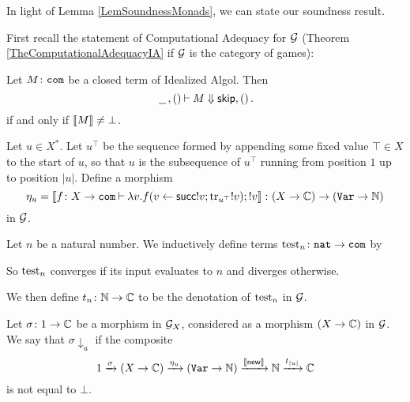In light of Lemma \ref{LemSoundnessMonads}, we can state our soundness result.

First recall the statement of Computational Adequacy for $\mathcal G$ (Theorem \ref{TheComputationalAdequacyIA} if $\mathcal G$ is the category of games):

\begin{theorem}
  Let $M\colon {\mathtt{com}}$ be a closed term of Idealized Algol.  
  Then
  \[
    \,\underline{\hspace{1.5ex}}\,,()\mathbin{\vdash} M\Downarrow {\mathsf{skip}},()\,.
    \]
  if and only if $\left\llbracket M\right\rrbracket \ne \bot$.
\end{theorem}

\begin{definition}
  Let $u\in X^*$.
  Let $u^\top$ be the sequence formed by appending some fixed value $\top\in X$ to the start of $u$, so that $u$ is the subsequence of $u^\top$ running from position $1$ up to position $|u|$.
  Define a morphism
  \[
    \eta_u = \left\llbracket f\colon X \to {\mathtt{com}} \mathbin{\vdash} \lambda v.f(v\gets \operatorname{{\mathsf{succ}}} !v;\operatorname{tr}_{u^\top} !v);!v\right\rrbracket \colon (X \to \mathbb{C}) \to ({\mathtt{Var}} \to \mathbb{N})
    \]
  in $\mathcal G$.
\end{definition}

\begin{definition}
  Let $n$ be a natural number.  
  We inductively define terms $\operatorname{test}_n\colon {\mathtt{nat}} \to {\mathtt{com}}$ by
  So $\operatorname{test}_n$ converges if its input evaluates to $n$ and diverges otherwise.

  We then define $t_n\colon \mathbb{N} \to \mathbb{C}$ to be the denotation of $\operatorname{test}_n$ in $\mathcal G$.
\end{definition}

\begin{definition}
  Let $\sigma \colon 1 \to \mathbb{C}$ be a morphism in $\mathcal G_X$, considered as a morphism $(X \to \mathbb{C})$ in $\mathcal G$.  
  We say that $\sigma\downarrow_u$ if the composite
  \[
    1 \xrightarrow{\sigma}
    (X \to \mathbb{C}) \xrightarrow{\eta_u}
    ({\mathtt{Var}} \to \mathbb{N}) \xrightarrow{\left\llbracket\operatorname{{\mathsf{new}}}\right\rrbracket}
    \mathbb{N} \xrightarrow{t_{|u|}}
    \mathbb{C}
    \]
  is not equal to $\bot$.
  \label{DefDenotationalUConvergence}
\end{definition}

